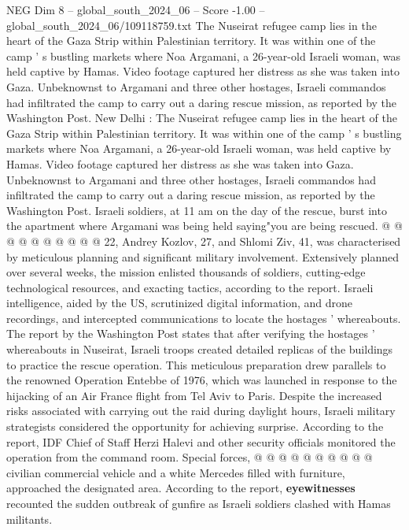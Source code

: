 \begin{textsample}{NEG Dim 8 – global\_south\_2024\_06 – Score -1.00 – global\_south\_2024\_06/109118759.txt}  \label{ex:f8_neg_242}
The Nuseirat refugee camp lies in the heart of the Gaza Strip within Palestinian territory.
It was within one of the camp ' s bustling markets where Noa Argamani, a 26-year-old Israeli woman, was held captive by Hamas.
Video footage captured her distress as she was taken into Gaza.
Unbeknownst to Argamani and three other hostages, Israeli commandos had infiltrated the camp to carry out a daring rescue mission, as reported by the Washington Post.
New Delhi : The Nuseirat refugee camp lies in the heart of the Gaza Strip within Palestinian territory.
It was within one of the camp ' s bustling markets where Noa Argamani, a 26-year-old Israeli woman, was held captive by Hamas.
Video footage captured her distress as she was taken into Gaza.
Unbeknownst to Argamani and three other hostages, Israeli commandos had infiltrated the camp to carry out a daring rescue mission, as reported by the Washington Post.
Israeli soldiers, at 11 am on the day of the rescue, burst into the apartment where Argamani was being held saying"you are being rescued. @ @ @ @ @ @ @ @ @ @ 22, Andrey Kozlov, 27, and Shlomi Ziv, 41, was characterised by meticulous planning and significant military involvement.
Extensively planned over several weeks, the mission enlisted thousands of soldiers, cutting-edge technological resources, and exacting tactics, according to the report.
Israeli intelligence, aided by the US, scrutinized digital information, and drone recordings, and intercepted communications to locate the hostages ' whereabouts.
The report by the Washington Post states that after verifying the hostages ' whereabouts in Nuseirat, Israeli troops created detailed replicas of the buildings to practice the rescue operation.
This meticulous preparation drew parallels to the renowned Operation Entebbe of 1976, which was launched in response to the hijacking of an Air France flight from Tel Aviv to Paris.
Despite the increased risks associated with carrying out the raid during daylight hours, Israeli military strategists considered the opportunity for achieving surprise.
According to the report, IDF Chief of Staff Herzi Halevi and other security officials monitored the operation from the command room.
Special forces, @ @ @ @ @ @ @ @ @ @ civilian commercial vehicle and a white Mercedes filled with furniture, approached the designated area.
According to the report, \textbf{eyewitnesses} recounted the sudden outbreak of gunfire as Israeli soldiers clashed with Hamas militants.

\end{textsample}
